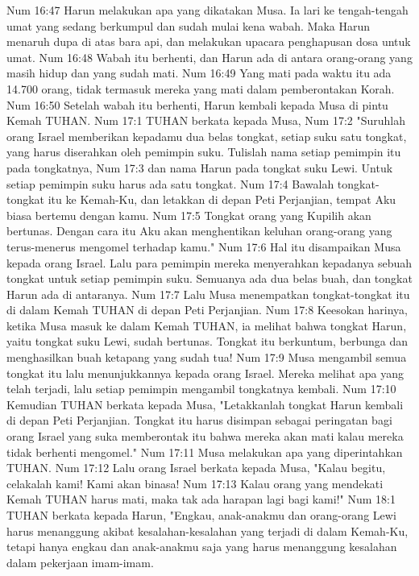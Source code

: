 Num 16:47  Harun melakukan apa yang dikatakan Musa. Ia lari ke tengah-tengah umat yang sedang berkumpul dan sudah mulai kena wabah. Maka Harun menaruh dupa di atas bara api, dan melakukan upacara penghapusan dosa untuk umat.
Num 16:48  Wabah itu berhenti, dan Harun ada di antara orang-orang yang masih hidup dan yang sudah mati.
Num 16:49  Yang mati pada waktu itu ada 14.700 orang, tidak termasuk mereka yang mati dalam pemberontakan Korah.
Num 16:50  Setelah wabah itu berhenti, Harun kembali kepada Musa di pintu Kemah TUHAN.
Num 17:1  TUHAN berkata kepada Musa,
Num 17:2  "Suruhlah orang Israel memberikan kepadamu dua belas tongkat, setiap suku satu tongkat, yang harus diserahkan oleh pemimpin suku. Tulislah nama setiap pemimpin itu pada tongkatnya,
Num 17:3  dan nama Harun pada tongkat suku Lewi. Untuk setiap pemimpin suku harus ada satu tongkat.
Num 17:4  Bawalah tongkat-tongkat itu ke Kemah-Ku, dan letakkan di depan Peti Perjanjian, tempat Aku biasa bertemu dengan kamu.
Num 17:5  Tongkat orang yang Kupilih akan bertunas. Dengan cara itu Aku akan menghentikan keluhan orang-orang yang terus-menerus mengomel terhadap kamu."
Num 17:6  Hal itu disampaikan Musa kepada orang Israel. Lalu para pemimpin mereka menyerahkan kepadanya sebuah tongkat untuk setiap pemimpin suku. Semuanya ada dua belas buah, dan tongkat Harun ada di antaranya.
Num 17:7  Lalu Musa menempatkan tongkat-tongkat itu di dalam Kemah TUHAN di depan Peti Perjanjian.
Num 17:8  Keesokan harinya, ketika Musa masuk ke dalam Kemah TUHAN, ia melihat bahwa tongkat Harun, yaitu tongkat suku Lewi, sudah bertunas. Tongkat itu berkuntum, berbunga dan menghasilkan buah ketapang yang sudah tua!
Num 17:9  Musa mengambil semua tongkat itu lalu menunjukkannya kepada orang Israel. Mereka melihat apa yang telah terjadi, lalu setiap pemimpin mengambil tongkatnya kembali.
Num 17:10  Kemudian TUHAN berkata kepada Musa, "Letakkanlah tongkat Harun kembali di depan Peti Perjanjian. Tongkat itu harus disimpan sebagai peringatan bagi orang Israel yang suka memberontak itu bahwa mereka akan mati kalau mereka tidak berhenti mengomel."
Num 17:11  Musa melakukan apa yang diperintahkan TUHAN.
Num 17:12  Lalu orang Israel berkata kepada Musa, "Kalau begitu, celakalah kami! Kami akan binasa!
Num 17:13  Kalau orang yang mendekati Kemah TUHAN harus mati, maka tak ada harapan lagi bagi kami!"
Num 18:1  TUHAN berkata kepada Harun, "Engkau, anak-anakmu dan orang-orang Lewi harus menanggung akibat kesalahan-kesalahan yang terjadi di dalam Kemah-Ku, tetapi hanya engkau dan anak-anakmu saja yang harus menanggung kesalahan dalam pekerjaan imam-imam.
